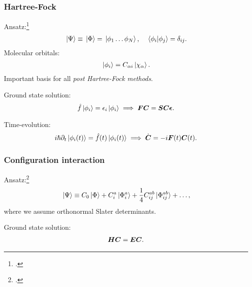\documentclass{beamer}
\begin{document}
\begin{frame}
    \frametitle{Hartree-Fock}
    Ansatz:\footcite{szabo1996modern}
    \begin{align}
        \ket*{\Psi} \equiv \ket*{\Phi}
        = \ket*{\phi_1 \dots \phi_N},
        \quad
        \braket*{\phi_i}{\phi_j} = \delta_{ij}.
    \end{align}
    Molecular orbitals:
    \begin{align}
        \ket*{\phi_i} = C_{\alpha i}\ket*{\chi_{\alpha}}.
    \end{align}
    Important basis for all \emph{post Hartree-Fock methods}.
\end{frame}

\begin{frame}
    Ground state solution:
    \begin{gather}
        \hat{f}\ket*{\phi_i} = \epsilon_i\ket*{\phi_i}
        \implies
        \boldsymbol{F}\boldsymbol{C}
        = \boldsymbol{S}\boldsymbol{C}\boldsymbol{\epsilon}.
    \end{gather}
\end{frame}

\begin{frame}
    Time-evolution:
    \begin{gather}
        i\hslash\partial_t\ket*{\phi_i(t)}
        = \hat{f}(t)\ket*{\phi_i(t)}
        \implies
        \dot{\boldsymbol{C}} = -i\boldsymbol{F}(t)\boldsymbol{C}(t).
    \end{gather}
\end{frame}

\begin{frame}
    \frametitle{Configuration interaction}
    Ansatz:\footcite{helgaker-molecular}
    \begin{align}
        \ket*{\Psi} \equiv C_0\ket*{\Phi}
        + C^{a}_{i}\ket*{\Phi^{a}_{i}}
        + \frac{1}{4}C^{ab}_{ij}\ket*{\Phi^{ab}_{ij}}
        + \dots,
    \end{align}
    where we assume orthonormal Slater determinants.
\end{frame}

\begin{frame}
    Ground state solution:
    \begin{align}
        \boldsymbol{H}\boldsymbol{C} = \boldsymbol{E}\boldsymbol{C}.
    \end{align}
\end{frame}
\end{document}
